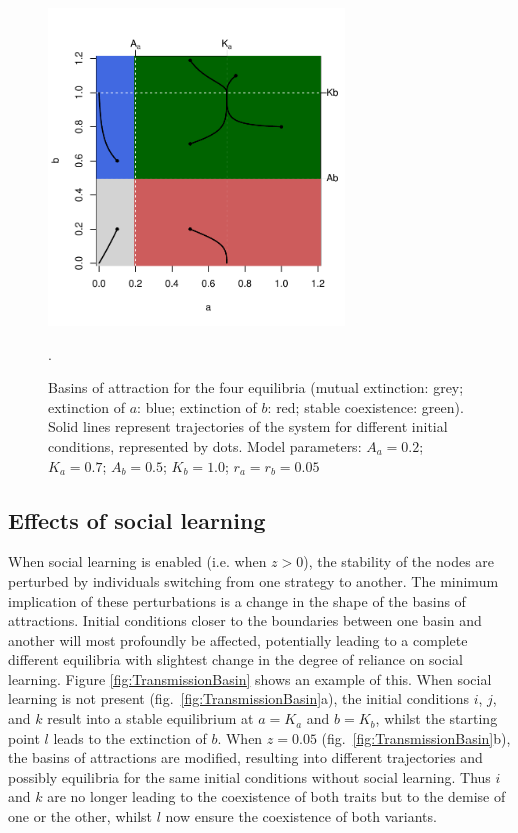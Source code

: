 \documentclass[preprint,authoryear]{elsarticle}
\begin{document}
\begin{figure}[h!]
  \centering
      \includegraphics[width=0.7\textwidth]{./figures/figure2.pdf}
  \caption{Basins of attraction for the four equilibria (mutual extinction: grey; extinction of $a$: blue; extinction of $b$: red; stable coexistence: green). Solid lines represent trajectories of the system for different initial conditions, represented by dots. Model parameters: $A_a=0.2$; $K_a=0.7$; $A_b=0.5$; $K_b=1.0$; $r_a=r_b=0.05$}.
    \label{fig:NoTransmissionBasin}
\end{figure}

\subsection{Effects of social learning}

When social learning is enabled (i.e. when $z>0$), the stability of the nodes are perturbed by individuals switching from one strategy to another. The minimum implication of these perturbations is a change in the shape of the basins of attractions. Initial conditions closer to the boundaries between one basin and another will most profoundly be affected, potentially leading to a complete different equilibria with slightest change in the degree of reliance on social learning. Figure \ref{fig:TransmissionBasin} shows an example of this. When social learning is not present (fig.~\ref{fig:TransmissionBasin}a), the initial conditions $i$, $j$, and $k$ result into a stable equilibrium at $a=K_a$ and $b=K_b$, whilst the starting point $l$ leads to the extinction of $b$. When $z=0.05$ (fig.~\ref{fig:TransmissionBasin}b), the basins of attractions are modified, resulting into different trajectories and possibly equilibria for the same initial conditions without social learning. Thus $i$ and $k$ are no longer leading to the coexistence of both traits but to the demise of one or the other, whilst $l$ now ensure the coexistence of both variants. 
\end{document}
